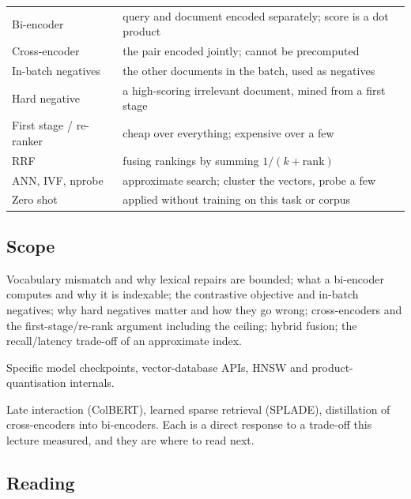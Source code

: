 \documentclass[11pt,a4paper]{article}
\begin{document}
\begin{center}
\small
\begin{tabular}{ll}
\toprule
Bi-encoder            & query and document encoded separately; score is a dot product \\
Cross-encoder         & the pair encoded jointly; cannot be precomputed \\
In-batch negatives    & the other documents in the batch, used as negatives \\
Hard negative         & a high-scoring irrelevant document, mined from a first stage \\
First stage / re-ranker & cheap over everything; expensive over a few \\
RRF                   & fusing rankings by summing $1/(k+\text{rank})$ \\
ANN, IVF, nprobe      & approximate search; cluster the vectors, probe a few \\
Zero shot             & applied without training on this task or corpus \\
\bottomrule
\end{tabular}
\end{center}

\subsection{Scope}

 Vocabulary mismatch and why lexical repairs are bounded;
what a bi-encoder computes and why it is indexable; the contrastive objective
and in-batch negatives; why hard negatives matter and how they go wrong;
cross-encoders and the first-stage/re-rank argument including the ceiling;
hybrid fusion; the recall/latency trade-off of an approximate index.

 Specific model checkpoints,
vector-database APIs, HNSW and product-quantisation internals.

 Late interaction (ColBERT), learned sparse
retrieval (SPLADE), distillation of cross-encoders into bi-encoders. Each is a
direct response to a trade-off this lecture measured, and they are where to
read next.

\subsection{Reading}
\end{document}
